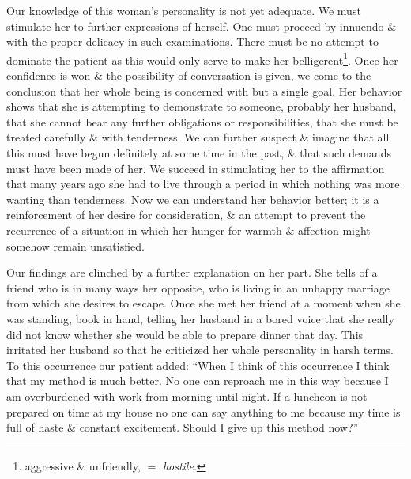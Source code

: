\documentclass{article}
\begin{document}
Our knowledge of this woman's personality is not yet adequate. We must stimulate her to further expressions of herself. One must proceed by innuendo \& with the proper delicacy in such examinations. There must be no attempt to dominate the patient as this would only serve to make her belligerent\footnote{aggressive \& unfriendly, $=$ {\it hostile}.}. Once her confidence is won \& the possibility of conversation is given, we come to the conclusion that her whole being is concerned with but a single goal. Her behavior shows that she is attempting to demonstrate to someone, probably her husband, that she cannot bear any further obligations or responsibilities, that she must be treated carefully \& with tenderness. We can further suspect \& imagine that all this must have begun definitely at some time in the past, \& that such demands must have been made of her. We succeed in stimulating her to the affirmation that many years ago she had to live through a period in which nothing was more wanting than tenderness. Now we can understand her behavior better; it is a reinforcement of her desire for consideration, \& an attempt to prevent the recurrence of a situation in which her hunger for warmth \& affection might somehow remain unsatisfied.

Our findings are clinched by a further explanation on her part. She tells of a friend who is in many ways her opposite, who is living in an unhappy marriage from which she desires to escape. Once she met her friend at a moment when she was standing, book in hand, telling her husband in a bored voice that she really did not know whether she would be able to prepare dinner that day. This irritated her husband so that he criticized her whole personality in harsh terms. To this occurrence our patient added: ``When I think of this occurrence I think that my method is much better. No one can reproach me in this way because I am overburdened with work from morning until night. If a luncheon is not prepared on time at my house no one can say anything to me because my time is full of haste \& constant excitement. Should I give up this method now?''
\end{document}
